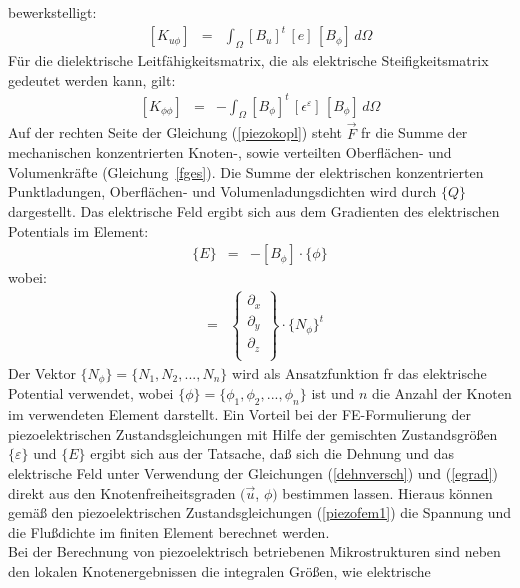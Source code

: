 bewerkstelligt:
\begin{eqnarray}
\label{piezomatrix}
 [K_{u \phi}] & = & \int_{\Omega} [B_{u}]^{t} \, [e] \, [B_{\phi}] \, d\Omega
\end{eqnarray}
Für die dielektrische Leitfähigkeitsmatrix, die als \glqq elektrische
Steifigkeitsmatrix\grqq \, gedeutet werden kann, gilt:
\begin{eqnarray}
\label{dielekmatrix}
 [K_{\phi \phi}] & = & -\int_{\Omega}
     [B_{\phi}]^{t} \, [\epsilon^{\varepsilon}] \, [B_{\phi}] \, d\Omega
\end{eqnarray}
Auf der rechten Seite der Gleichung (\ref{piezokopl}) steht $\vec F$ fr
die Summe der mechanischen konzentrierten Knoten-, sowie verteilten
Oberflächen- und
Volumenkräfte (Gleichung~\ref{fges}). Die Summe der elektrischen
konzentrierten Punktladungen, Oberflächen- und Volumenladungsdichten wird
durch $\{Q\}$ dargestellt. Das elektrische Feld ergibt sich aus
dem Gradienten des elektrischen Potentials im Element:
\begin{eqnarray}
\label{egrad}
 \{E\} & = & - [ B_{\phi} ] \cdot \{ \phi \}
\end{eqnarray}
wobei:
\begin{eqnarray}
 [B_{\phi}] & = &
 \left \{
  \begin{array}{c}
    \partial_{x} \\ \partial_{y} \\ \partial_{z} \\
   \end{array}
  \right \} \cdot  \{ N_{\phi} \}^{t}
\end{eqnarray}
Der Vektor $\{N_{\phi}\} = \{N_{1}, N_{2},..., N_{n}\}$ wird als
Ansatzfunktion fr das elektrische Potential verwendet, wobei
$\{\phi\} = \{\phi_{1}, \phi_{2},..., \phi_{n}\}$ ist und $n$ die Anzahl
der Knoten im verwendeten Element darstellt. Ein Vorteil bei der
FE-Formulierung der piezoelektrischen Zustandsgleichungen mit Hilfe der
gemischten Zustandsgrößen $\{\varepsilon\}$ und $\{E\}$ ergibt sich aus der
Tatsache, daß sich die Dehnung und das elektrische Feld unter Verwendung
der Gleichungen (\ref{dehnversch}) und (\ref{egrad}) direkt aus den
Knotenfreiheitsgraden $(\vec u$, $\phi)$ bestimmen lassen. Hieraus können
gemäß den piezoelektrischen Zustandsgleichungen (\ref{piezofem1}) die
Spannung und die Flußdichte im finiten Element berechnet werden. \\
Bei der Berechnung von piezoelektrisch betriebenen Mikrostrukturen sind neben
den lokalen Knotenergebnissen die integralen Größen, wie elektrische
